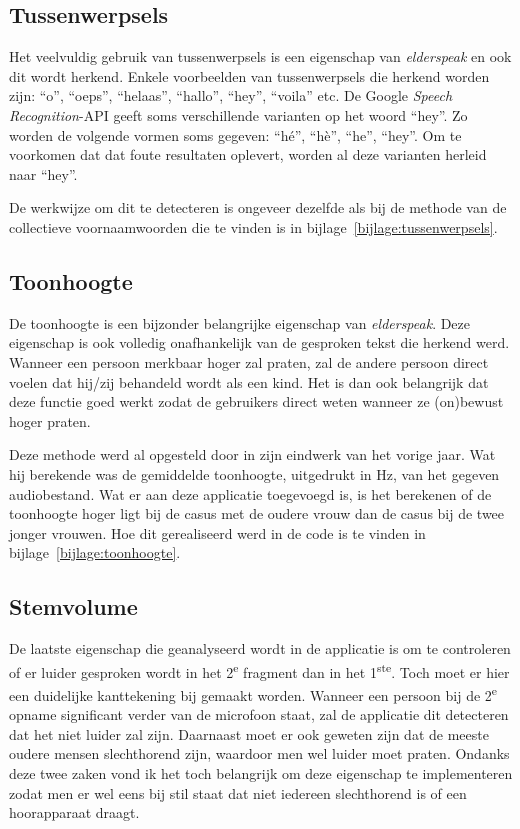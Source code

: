 \subsection{Tussenwerpsels}
Het veelvuldig gebruik van tussenwerpsels is een eigenschap van \textit{elderspeak} en ook dit wordt herkend. Enkele voorbeelden van tussenwerpsels die herkend worden zijn: ``o'', ``oeps'', ``helaas'', ``hallo'', ``hey'', ``voila'' etc. De Google \textit{Speech Recognition}-API geeft soms verschillende varianten op het woord ``hey''. Zo worden de volgende vormen soms gegeven: ``hé'', ``hè'', ``he'', ``hey''. Om te voorkomen dat dat foute resultaten oplevert, worden al deze varianten herleid naar ``hey''.

De werkwijze om dit te detecteren is ongeveer dezelfde als bij de methode van de collectieve voornaamwoorden die te vinden is in bijlage~\ref{bijlage:tussenwerpsels}.

\subsection{Toonhoogte}
De toonhoogte is een bijzonder belangrijke eigenschap van \textit{elderspeak}. Deze eigenschap is ook volledig onafhankelijk van de gesproken tekst die herkend werd. Wanneer een persoon merkbaar hoger zal praten, zal de andere persoon direct voelen dat hij/zij behandeld wordt als een kind. Het is dan ook belangrijk dat deze functie goed werkt zodat de gebruikers direct weten wanneer ze (on)bewust hoger praten.

Deze methode werd al opgesteld door \textcite{Standaert2021} in zijn eindwerk van het vorige jaar. Wat hij berekende was de gemiddelde toonhoogte, uitgedrukt in Hz, van het gegeven audiobestand. Wat er aan deze applicatie toegevoegd is, is het berekenen of de toonhoogte hoger ligt bij de casus met de oudere vrouw dan de casus bij de twee jonger vrouwen.
Hoe dit gerealiseerd werd in de code is te vinden in bijlage~\ref{bijlage:toonhoogte}.

\subsection{Stemvolume}
De laatste eigenschap die geanalyseerd wordt in de applicatie is om te controleren of er luider gesproken wordt in het 2\textsuperscript{e} fragment dan in het 1\textsuperscript{ste}. Toch moet er hier een duidelijke kanttekening bij gemaakt worden. Wanneer een persoon bij de 2\textsuperscript{e} opname significant verder van de microfoon staat, zal de applicatie dit detecteren dat het niet luider zal zijn. Daarnaast moet er ook geweten zijn dat de meeste oudere mensen slechthorend zijn, waardoor men wel luider moet praten. Ondanks deze twee zaken vond ik het toch belangrijk om deze eigenschap te implementeren zodat men er wel eens bij stil staat dat niet iedereen slechthorend is of een hoorapparaat draagt.

